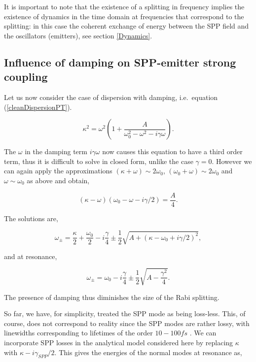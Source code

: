 \documentclass[12pt]{iopart}
\begin{document}
It is important to note that the existence of a splitting in frequency implies the existence of dynamics in the time domain at frequencies that correspond to the splitting: in this case the coherent exchange of energy between the SPP field and the oscillators (emitters), see section \ref{Dynamics}. 


\subsection{Influence of damping on SPP-emitter strong coupling}  \label{classicwithdampingPT}


Let us now consider the case of dispersion with damping, i.e.\ equation (\ref{cleanDispersionPT}).

\begin{equation}
\kappa^2 =\omega^2 \left( 1 + \frac{A}{ \omega_0^2 - \omega^2 - i\gamma \omega} \right) .
\label{cleanDispersionTwoPT}
\end{equation}

\noindent The $\omega$ in the damping term $i \gamma \omega$ now causes this equation to have a third order term, thus it is difficult to solve in closed form, unlike the case $\gamma = 0$. However we can again apply the approximations $(\kappa+\omega) \sim 2\omega_0$, $(\omega_0+\omega)\sim 2\omega_0$ and $\omega \sim \omega_0$ as above and obtain,
 
\begin{equation}
(\kappa-\omega)(\omega_0-\omega - i \gamma/2)= \frac{A}{4}.
\label{apprDampingPT}
\end{equation}

\noindent The solutions are,

\begin{equation}
\omega_\pm = \frac{\kappa}{2} + \frac{\omega_0}{2} - i \frac{\gamma}{4} \pm \frac{1}{2}\sqrt{A+(\kappa-\omega_0+i\gamma/2)^2} ,
\end{equation}

\noindent and at resonance,

\begin{equation}
\omega_\pm = \omega_0 - i \frac{\gamma}{4} \pm \frac{1}{2}\sqrt{A-\frac{\gamma^2}{4}}.
\end{equation}

\noindent The presence of damping thus diminishes the size of the Rabi splitting.

So far, we have, for simplicity, treated the SPP mode as being loss-less. This, of course, does not correspond to reality since the SPP modes are rather lossy, with linewidths corresponding to lifetimes of the order $10-100 fs$ \cite{van_Exter_PRL_1988_60_49,Sonnichsen_2002_PRL_88_077402}. We can incorporate SPP losses in the analytical model considered here by replacing $\kappa$ with $\kappa - i\gamma_{SPP}/2$. 
This gives the energies of the normal modes at resonance as,
\end{document}
